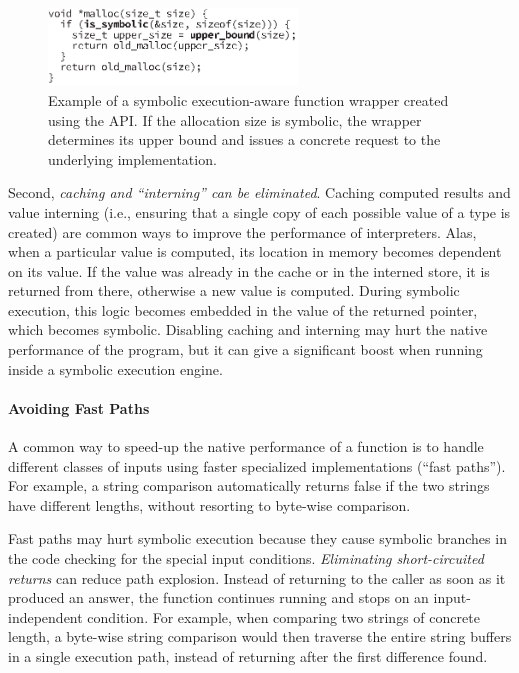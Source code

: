 \begin{figure}
  \centering
  \includegraphics[width=2.6in]{figures/chef/mallocopt}
  \caption{Example of a symbolic execution-aware  function wrapper created using the \chef API.  If the allocation size is symbolic, the wrapper determines its upper bound and issues a concrete request to the underlying implementation.}
  \label{fig:sym-malloc}
\end{figure}

Second, \emph{caching and ``interning'' can be eliminated}.  Caching computed results and value interning (i.e., ensuring that a single copy of each possible value of a type is created) are common ways to improve the performance of interpreters.  Alas, when a particular value is computed, its location in memory becomes dependent on its value. If the value was already in the cache or in the interned store, it is returned from there, otherwise a new value is computed.  During symbolic execution, this logic becomes embedded in the value of the returned pointer, which becomes symbolic.  Disabling caching and interning may hurt the native performance of the program, but it can give a significant boost when running inside a symbolic execution engine.

\paragraph{Avoiding Fast Paths}

A common way to speed-up the native performance of a function is to handle different classes of inputs using faster specialized implementations (``fast paths'').  For example, a string comparison automatically returns false if the two strings have different lengths, without resorting to byte-wise comparison.

Fast paths may hurt symbolic execution because they cause symbolic branches in the code checking for the special input conditions.  \emph{Eliminating short-circuited returns} can reduce path explosion.  Instead of returning to the caller as soon as it produced an answer, the function continues running and stops on an input-independent condition.  For example, when comparing two strings of concrete length, a byte-wise string comparison would then traverse the entire string buffers in a single execution path, instead of returning after the first difference found.


